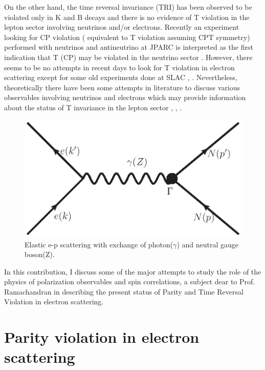    On the other hand, the time reversal invariance (TRI) has been observed to be violated only in K and B decays and there is no evidence of T  violation in the  lepton sector  involving neutrinos and/or  electrons.  Recently an experiment looking for CP  violation ( equivalent to T    violation assuming CPT symmetry) performed with neutrinos and antineutrino at JPARC  is  interpreted as the first indication that T (CP) may be violated in the neutrino sector \cite{key17}. However,  there seems to be no attempts in recent days to look for T  violation  in electron scattering except for some old experiments done at SLAC \cite{key18}, \cite{key19}. Nevertheless, theoretically there have been some attempts in literature to discuss various  observables involving neutrinos and electrons which may provide information about the status of T  invariance in the lepton  sector  \cite{key14}, \cite{key15}, \cite{key21}. 
   \begin{figure}[H]
\centering
\includegraphics[scale=0.48]{src/images/chap9/fig1.eps}
	\caption{Elastic e-p scattering with exchange of photon($\gamma$) and neutral gauge boson(Z).}
\end{figure}
      
   
   
     In this contribution,  I discuss some of the major  attempts to study the role of the physics of polarization observables and spin correlations, a subject dear to Prof. Ramachandran in describing the present status of Parity and Time Reversal Violation in electron scattering.
     
    
     \section{Parity violation in electron scattering}\label{chap9-sec3}
     
